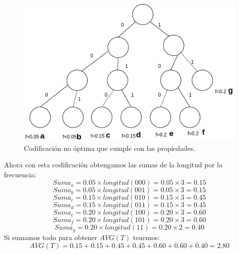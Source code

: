 \documentclass[12pt]{article}
\begin{document}
\subsection{}
\begin{figure}[h]
	\begin{center}
		\includegraphics[scale=0.8]{codificacion}
	\end{center}
	\caption{Codificación no óptima que cumple con las propiedades.}
\end{figure}
Ahora con esta codificación obtengamos las sumas de la longitud por la frecuencia:
\begin{equation}
Suma_a = 0.05 \times longitud(000) = 0.05 \times 3 = 0.15
\end{equation}
\begin{equation}
Suma_b = 0.05 \times longitud(001) = 0.05 \times 3 = 0.15
\end{equation}
\begin{equation}
Suma_c = 0.15 \times longitud(010) = 0.15 \times 3 = 0.45
\end{equation}
\begin{equation}
Suma_d = 0.15 \times longitud(011) = 0.15 \times 3 = 0.45
\end{equation}
\begin{equation}
Suma_e = 0.20 \times longitud(100) = 0.20 \times 3 = 0.60
\end{equation}
\begin{equation}
Suma_f = 0.20 \times longitud(101) = 0.20 \times 3 = 0.60
\end{equation}
\begin{equation}
Suma_g = 0.20 \times longitud(11) = 0.20 \times 2 = 0.40
\end{equation}
Si sumamos todo para obtener $AVG(T)$ tenemos:
\begin{equation}
AVG(T)= 0.15 + 0.15 + 0.45  + 0.45 + 0.60  + 0.60 + 0.40= 2.80
\end{equation}
\end{document}
